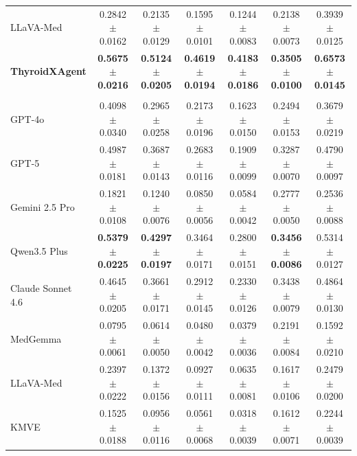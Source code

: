 \documentclass[fleqn,10pt]{wlscirep}
\begin{document}
\begin{appendices}
\begin{table}[p]
\begin{threeparttable}
\begin{tabular}{lcccccc}
LLaVA-Med~\cite{li_llavamed_2023}
& 0.2842$\pm$0.0162
& 0.2135$\pm$0.0129
& 0.1595$\pm$0.0101
& 0.1244$\pm$0.0083
& 0.2138$\pm$0.0073
& 0.3939$\pm$0.0125 \\

\rowcolor{lightgray}
\textbf{ThyroidXAgent}
& \textbf{0.5675$\pm$0.0216}
& \textbf{0.5124$\pm$0.0205}
& \textbf{0.4619$\pm$0.0194}
& \textbf{0.4183$\pm$0.0186}
& \textbf{0.3505$\pm$0.0100}
& \textbf{0.6573$\pm$0.0145} \\

\midrule

\rowcolor{gray!20}
\multicolumn{7}{c}{\textbf{ZJH-TS Testset} ($n=150$)} \\

GPT-4o~\cite{openai_gpt4_2024}
& 0.4098$\pm$0.0340
& 0.2965$\pm$0.0258
& 0.2173$\pm$0.0196
& 0.1623$\pm$0.0150
& 0.2494$\pm$0.0153
& 0.3679$\pm$0.0219 \\

GPT-5~\cite{openai2025gpt5systemcard}
& 0.4987$\pm$0.0181
& 0.3687$\pm$0.0143
& 0.2683$\pm$0.0116
& 0.1909$\pm$0.0099
& 0.3287$\pm$0.0070
& 0.4790$\pm$0.0097 \\

Gemini 2.5 Pro~\cite{comanici_gemini_2025}
& 0.1821$\pm$0.0108
& 0.1240$\pm$0.0076
& 0.0850$\pm$0.0056
& 0.0584$\pm$0.0042
& 0.2777$\pm$0.0050
& 0.2536$\pm$0.0088 \\

Qwen3.5 Plus~\cite{yang_qwen3_2025}
& \textbf{0.5379$\pm$0.0225}
& \textbf{0.4297$\pm$0.0197}
& 0.3464$\pm$0.0171
& 0.2800$\pm$0.0151
& \textbf{0.3456$\pm$0.0086}
& 0.5314$\pm$0.0127 \\

Claude Sonnet 4.6
& 0.4645$\pm$0.0205
& 0.3661$\pm$0.0171
& 0.2912$\pm$0.0145
& 0.2330$\pm$0.0126
& 0.3438$\pm$0.0079
& 0.4864$\pm$0.0130 \\

MedGemma~\cite{sellergren2025medgemma}
& 0.0795$\pm$0.0061
& 0.0614$\pm$0.0050
& 0.0480$\pm$0.0042
& 0.0379$\pm$0.0036
& 0.2191$\pm$0.0084
& 0.1592$\pm$0.0210 \\

LLaVA-Med~\cite{li_llavamed_2023}
& 0.2397$\pm$0.0222
& 0.1372$\pm$0.0156
& 0.0927$\pm$0.0111
& 0.0635$\pm$0.0081
& 0.1617$\pm$0.0106
& 0.2479$\pm$0.0200 \\

KMVE~\cite{li_ultrasound_2024}
& 0.1525$\pm$0.0188
& 0.0956$\pm$0.0116
& 0.0561$\pm$0.0068
& 0.0318$\pm$0.0039
& 0.1612$\pm$0.0071
& 0.2244$\pm$0.0039 \\


\end{tabular}
\end{threeparttable}
\end{table}
\end{appendices}
\end{document}
